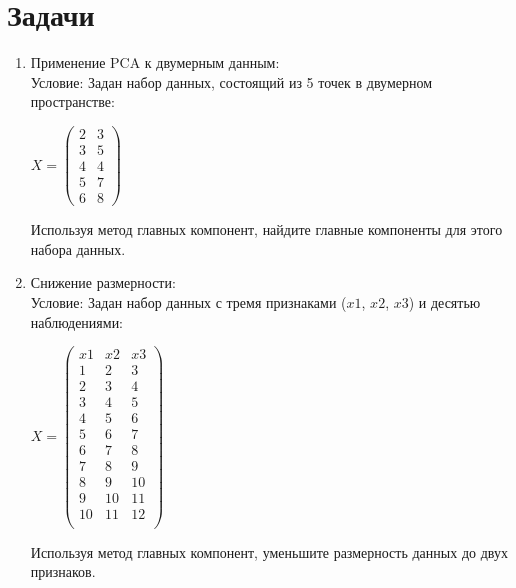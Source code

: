 \section{Задачи}
\begin{enumerate}
    \item 
        Применение PCA к двумерным данным: \\
        Условие: Задан набор данных, состоящий из 5 точек в двумерном пространстве:  \\
         \begin{center}
         $X = 
             \begin{pmatrix}
              2 &  3 \\
              3 &  5 \\
              4 &  4 \\
              5 &  7 \\
              6 &  8 
             \end{pmatrix}$\par
        \end{center}
        Используя метод главных компонент, найдите главные компоненты для этого набора данных.
    \item 
        Снижение размерности: \\
        Условие: Задан набор данных с тремя признаками ($x1$, $x2$, $x3$) и десятью наблюдениями: \\
        \begin{center}
         $X = 
             \begin{pmatrix}
              x1 &  x2 &  x3\\
              1 &  2 &  3\\
              2 &  3 &  4\\
              3 &  4 &  5\\
              4 &  5 &  6\\
              5 &  6 &  7\\
              6 &  7 &  8\\
              7 &  8 &  9\\
              8 &  9 &  10\\
              9 &  10 &  11\\
              10 &  11 &  12\\
             \end{pmatrix}$\par
        \end{center}
        Используя метод главных компонент, уменьшите размерность данных до двух признаков.

\end{enumerate}
